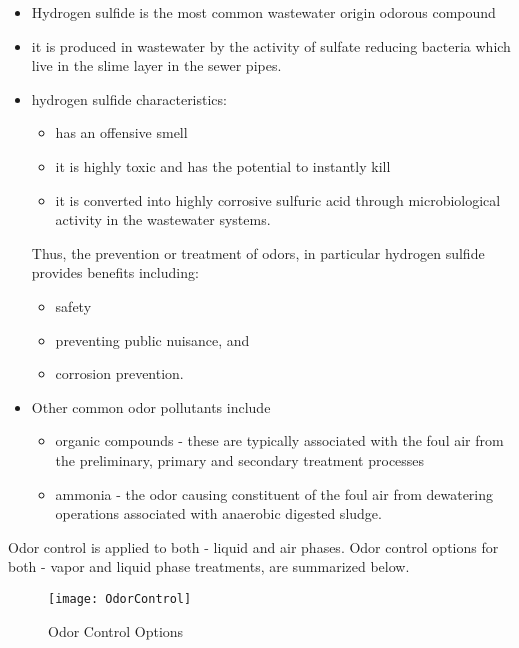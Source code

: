 \begin{itemize}
	\item Hydrogen sulfide is the most common wastewater origin odorous compound
	\item it is produced in wastewater by the activity of sulfate reducing bacteria which live in the slime layer in the sewer pipes.  
	\item hydrogen sulfide characteristics:
	\begin{itemize}
		\item has an offensive smell
		\item it is highly toxic and has the potential to instantly kill  
		\item it is converted into highly corrosive sulfuric acid through microbiological activity in the wastewater systems.  
	\end{itemize}
Thus, the prevention or treatment of odors, in particular hydrogen sulfide provides benefits including:
	\begin{itemize}
		\item safety
		\item preventing public nuisance, and
		\item  corrosion prevention.\\
	\end{itemize}
\vspace{0.5cm}
\item Other common odor pollutants include
\begin{itemize}
\item organic compounds - these are typically associated with the foul air from the preliminary, primary and secondary treatment processes
\item ammonia - the odor causing constituent of the foul air from dewatering operations associated with anaerobic digested sludge.\\
\end{itemize}
\end{itemize}
\vspace{0.5cm}
Odor control is applied to both - liquid and air phases. Odor control options for both - vapor and liquid phase treatments, are summarized below.


\begin{figure}
	\begin{center}
		\texttt{[image: OdorControl]}
			\caption{Odor Control Options}
	\end{center}
	
	\end{figure}


